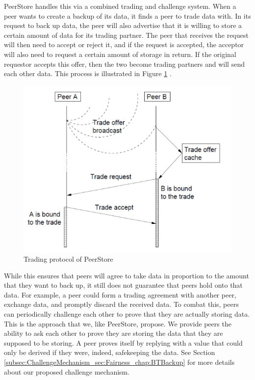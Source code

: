 \documentclass[12pt]{report}
\begin{document}
PeerStore handles this via a combined trading and challenge system. When a peer wants to create a backup of its data, it finds a peer to trade data with. In its request to back up data, the peer will also advertise that it is willing to store a certain amount of data for its trading partner. The peer that receives the request will then need to accept or reject it, and if the request is accepted, the acceptor will also need to request a certain amount of storage in return. If the original requestor accepts this offer, then the two become trading partners and will send each other data. This process is illustrated in Figure \ref{fig:peerStoreTrading} \cite{PeerStore}.

\begin{figure}
  \centering
  \includegraphics[scale=0.75]{figures/PeerStoreTrading}
  \caption{Trading protocol of PeerStore \cite{PeerStore} \label{fig:peerStoreTrading}}
\end{figure}

While this ensures that peers will agree to take data in proportion to the amount that they want to back up, it still does not guarantee that peers hold onto that data. For example, a peer could form a trading agreement with another peer, exchange data, and promptly discard the received data. To combat this, peers can periodically challenge each other to prove that they are actually storing data. This is the approach that we, like PeerStore, propose. We provide peers the ability to ask each other to prove they are storing the data that they are supposed to be storing. A peer proves itself by replying with a value that could only be derived if they were, indeed, safekeeping the data. See Section \ref{subsec:ChallengeMechanism_sec:Fairness_chap:BTBackup}
 for more details about our proposed challenge mechanism.
\end{document}
